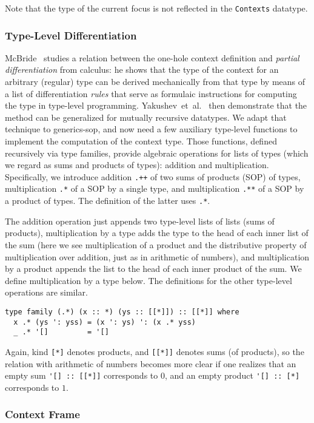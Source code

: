 \documentclass[runningheads]{llncs}
\newcommand{\K}[1]{\lstinline[style=fancy]{#1}}
\begin{document}
Note that the type of the current focus is not reflected in the \K{Contexts} datatype.

\subsubsection{Type-Level Differentiation}

McBride~\cite{McBride2001} studies a relation between the one-hole context definition and \emph{partial differentiation} from calculus: he shows that the type of the context for an arbitrary (regular) type can be derived mechanically from that type by means of a list of differentiation \emph{rules} that serve as formulaic instructions for computing the type in type-level programming. Yakushev~et~al.~\cite{MuRec2009} then demonstrate that the method can be generalized for mutually recursive datatypes. We adapt that technique to \textsf{generics-sop}, and now need a few auxiliary type-level functions to implement the computation of the context type. Those functions, defined recursively via type families, provide algebraic operations for lists of types (which we regard as sums and products of types): addition and multiplication. Specifically, we introduce addition \K{.++} of two sums of products (SOP) of types, multiplication \K{.*} of a SOP by a single type, and multiplication \K{.**} of a SOP by a product of types. The definition of the latter uses \K{.*}.

The addition operation just appends two type-level lists of lists (sums of products), multiplication by a type adds the type to the head of each inner list of the sum (here we see multiplication of a product and the distributive property of multiplication over addition, just as in arithmetic of numbers), and multiplication by a product appends the list to the head of each inner product of the sum. We define multiplication by a type below. The definitions for the other type-level operations are similar.
\begin{lstlisting}[style=fancy]
type family (.*) (x :: *) (ys :: [[*]]) :: [[*]] where
  x .* (ys ': yss) = (x ': ys) ': (x .* yss)
  _ .* '[]         = '[]
\end{lstlisting}

Again, kind \K{[*]} denotes products, and \K{[[*]]} denotes sums (of products), so the relation with arithmetic of numbers becomes more clear if one realizes that an empty sum \K{'[] :: [[*]]} corresponds to $0$, and an empty product \K{'[] :: [*]} corresponds to $1$.

\subsubsection{Context Frame}
\end{document}

